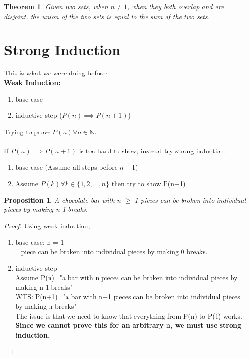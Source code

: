 \documentclass{article}
\newcommand{\AllNaturals}{\mathbb{N}}
\newtheorem{proposition}{Proposition}
\newtheorem{theorem}{Theorem}
\begin{document}
\begin{theorem}
    Given two sets, when \(n \neq 1\), when they both overlap and are disjoint, the union of the two sets is equal to the sum of the two sets.
\end{theorem}
\pagebreak
\section{Strong Induction}
This is what we were doing before:\\
\textbf{Weak Induction:}
\begin{enumerate}
    \item base case
    \item inductive step (\(P(n) \implies P(n+1)\))
\end{enumerate}
Trying to prove \(P(n) \forall n \in \AllNaturals\).\\\\
If \(P(n) \implies P(n+1)\) is too hard to show, instead try strong induction:
\begin{enumerate}
    \item base case (Assume all steps before \(n+1\))
    \item Assume \(P(k)\forall k \in \{1,2,...,n\}\) then try to show P(n+1)
\end{enumerate}
\begin{proposition}
    A chocolate bar with n \(\geq\) 1 pieces can be broken into individual pieces by making n-1 breaks.
\end{proposition}
\begin{proof}
    Using weak induction,
    \begin{enumerate}
        \item base case: n = 1\\
        1 piece can be broken into individual pieces by making 0 breaks.
        \item inductive step\\
        Assume P(n)="a bar with n pieces can be broken into individual pieces by making n-1 breaks"\\
        WTS: P(n+1)="a bar with n+1 pieces can be broken into individual pieces by making n breaks"\\
        The issue is that we need to know that everything from P(n) to P(1) works.\\
        \textbf{Since we cannot prove this for an arbitrary n, we must use strong induction.}\\
    \end{enumerate}
\end{proof}
\end{document}
